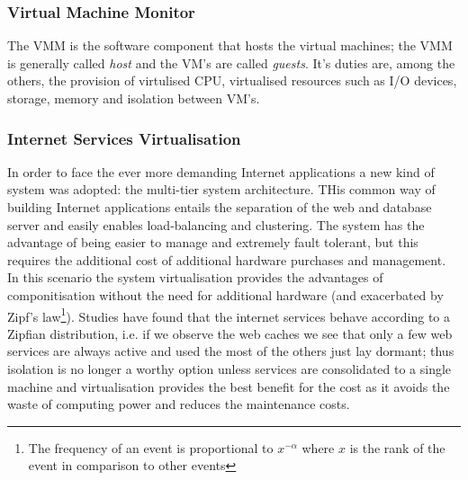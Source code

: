 \subsubsection{Virtual Machine Monitor}
The VMM is the software component that hosts the virtual machines; the VMM is
generally called \textit{host} and the VM's are called \textit{guests}.  It's duties are, among the others, the
provision of virtulised CPU, virtualised resources such as I/O devices, storage, memory and isolation between VM's.
\subsubsection{Internet Services Virtualisation} In order to face the ever more demanding Internet applications a new
kind of system was adopted: the multi-tier system architecture. THis common way of building Internet applications
entails the separation of the web and database server and easily enables load-balancing and clustering. The system has 
the advantage of being easier to manage and extremely fault tolerant, but this requires the additional cost of additional 
hardware purchases and management.
In this scenario the system virtualisation provides the advantages of componitisation without the need for additional 
hardware (and exacerbated by Zipf's law\footnote{The frequency of an event is proportional to $x^{-\alpha}$ where $x$ 
is the rank of the event in comparison to other events}). Studies have found that the internet services behave according
to a Zipfian distribution, i.e. if we observe the web caches we see that only a few web services are always active and 
used the most of the others just lay dormant; thus isolation is no longer a worthy option unless services are
consolidated to a single machine and virtualisation provides the best benefit for the cost as it avoids the waste of
computing power and reduces the maintenance costs.
